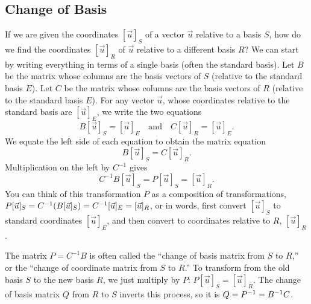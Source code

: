 \subsection{Change of Basis}

If we are given the coordinates $[\vec u]_S$ of a vector $\vec u$ relative to a basis $S$, how do we find the coordinates $[\vec u]_{R}$ of $\vec u$ relative to a different basis $R$? 
We can start by writing everything in terms of a single basis (often the standard basis).
Let $B$ be the matrix whose columns are the basis vectors of $S$ (relative to the standard basis $E$). 
Let $C$ be the matrix whose columns are the basis vectors of $R$ (relative to the standard basis $E$). 
For any vector $\vec u$, whose coordinates relative to the standard basis are $[\vec u]_E$, we write the two equations $$B[\vec u]_S=[\vec u]_E\quad \text {and}\quad C[\vec u]_{R}=[\vec u]_E.$$ 
We equate the left side	of each equation to obtain the matrix equation 
$$B[\vec u]_S=C[\vec u]_{R}.$$ 
Multiplication on the left by $C^{-1}$ gives $$C^{-1}B[\vec u]_S=P[\vec u]_S=[\vec u]_{R}.$$  
You can think of this transformation $P$ as a composition of transformations, $P[\vec u]_S=C^{-1} (B[\vec u]_S)=C^{-1} [\vec u]_E=[\vec u]_R$, or in words, first convert $[\vec u]_S$ to standard coordinates $[\vec u]_E$, and then convert to coordinates relative to $R$, $[\vec u]_R$.

The matrix $P=C^{-1}B$ is often called the ``change of basis matrix from $S$ to $R$,'' or the ``change of coordinate matrix from $S$ to $R$.''  To transform from the old basis $S$ to the new basis $R$, we just multiply by $P$: $P[\vec u]_S=[\vec u]_{R}$. The change of basis matrix $Q$ from $R$ to $S$ inverts this process, so it is $Q=P^{-1}=B^{-1} C$.

